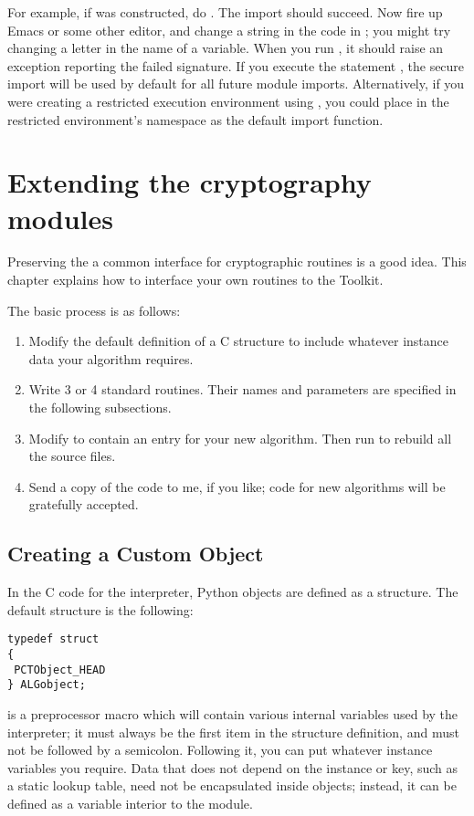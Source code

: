 \documentclass{howto}
\begin{document}
For example, if  was constructed, do
.  The import should succeed.  Now fire up Emacs
or some other editor, and change a string in the code in ;
you might try changing a letter in the name of a variable.  When you run
, it should raise an exception reporting the
failed signature.  If you execute the statement , the secure import will be used by default for all future
module imports.  Alternatively, if you were creating a restricted
execution environment using , you could place
 in the restricted environment's namespace as the
default import function.

\section{Extending the cryptography modules}
Preserving the a common interface for cryptographic routines is a
good idea.  This chapter
explains how to interface your own routines to the Toolkit.

The basic process is as follows:
\begin{enumerate}
\item  Modify the default definition of a C structure to include
whatever instance data your algorithm requires.
\item  Write 3 or 4 standard routines.  Their names and parameters are
specified in the following subsections.
\item  Modify  to contain an entry for your new
algorithm.  Then run  to rebuild all the source files. 
\item  Send a copy of the code to me, if you like; code for new
algorithms will be gratefully accepted.
\end{enumerate}

\subsection{Creating a Custom Object}
In the C code for the interpreter, Python objects are defined as a
structure.  The default structure is the following:
\begin{verbatim}
typedef struct 
{
 PCTObject_HEAD
} ALGobject;
\end{verbatim}


 is a preprocessor macro which will contain various
internal variables used by the interpreter; it must always be the
first item in the structure definition, and must not be followed by a
semicolon.  Following it, you can put whatever instance variables you
require.  Data that does not depend on the instance or key, such as a
static lookup table, need not be encapsulated inside objects; instead,
it can be defined as a variable interior to the module.
\end{document}
